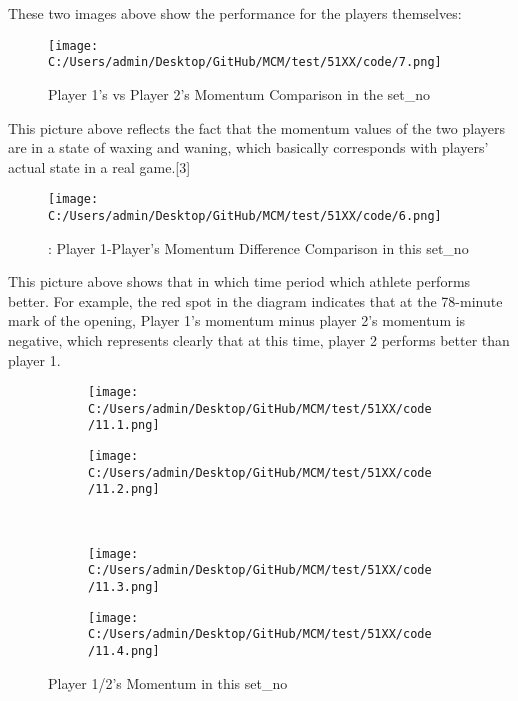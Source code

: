 \documentclass{mcmthesis}
\begin{document}
    These two images above show the performance for the players themselves:

\begin{figure}[h]   
\centering          
\texttt{[image: C:/Users/admin/Desktop/GitHub/MCM/test/51XX/code/7.png]}
\caption{Player 1’s vs Player 2’s Momentum Comparison in the set\_no} \label{fig6}    
\end{figure} 

    This picture above reflects the fact that the momentum values of the two players are in a state
of waxing and waning, which basically corresponds with players’ actual state in a real game.[3]
\newpage

\begin{figure}[h]   
\centering          
\texttt{[image: C:/Users/admin/Desktop/GitHub/MCM/test/51XX/code/6.png]}
\caption{: Player 1-Player’s Momentum Difference Comparison in this set\_no} \label{fig7}    
\end{figure} 

    This picture above shows that in which time period which athlete performs better. For
example, the red spot in the diagram indicates that at the 78-minute mark of the opening, Player
1’s momentum minus player 2’s momentum is negative, which represents clearly that at this time, player 2 performs better than player 1.

\begin{figure}[h]
    \centering
    \begin{subfigure}{0.45\textwidth}  
        \texttt{[image: C:/Users/admin/Desktop/GitHub/MCM/test/51XX/code/11.1.png]}  
        \label{fig:first}
    \end{subfigure}
    \hfill
    \begin{subfigure}{0.45\textwidth}
        \texttt{[image: C:/Users/admin/Desktop/GitHub/MCM/test/51XX/code/11.2.png]}
        \label{fig:second}
    \end{subfigure}\\
    \begin{subfigure}{0.45\textwidth}  
        \texttt{[image: C:/Users/admin/Desktop/GitHub/MCM/test/51XX/code/11.3.png]}  
        \label{fig:third}
    \end{subfigure}
    \begin{subfigure}{0.45\textwidth}  
        \texttt{[image: C:/Users/admin/Desktop/GitHub/MCM/test/51XX/code/11.4.png]}  
        \label{fig:forth}
    \end{subfigure}
    
    \caption{Player 1/2’s Momentum in this set\_no} 
    \label{fig:twoimages}
\end{figure}
\end{document}

